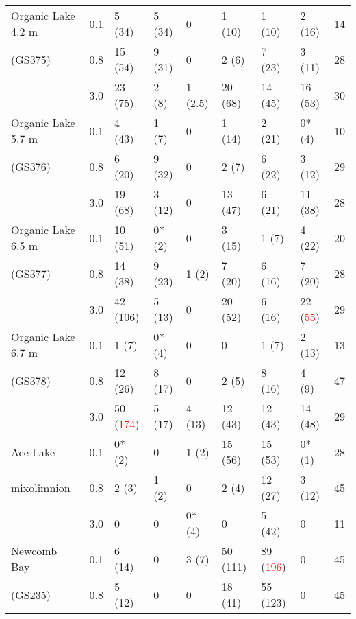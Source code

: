 \begin{longtable}{p{2.8cm}p{0.5cm}p{1.2cm}p{1cm}p{1cm}p{1.4cm}p{1.4cm}p{1.2cm}p{0.5cm}}
Organic Lake 4.2 m             & 0.1 & 5 (34)   & 5 (34)  & 0       & 1 (10)    & 1 (10)    & 2 (16)  & 14 \\
           (GS375)             & 0.8 & 15 (54)  & 9 (31)  & 0       & 2 (6)     & 7 (23)    & 3 (11)  & 28 \\
                               & 3.0 & 23 (75)  & 2 (8)   & 1 (2.5) & 20 (68)   & 14 (45)   & 16 (53) & 30 \\
Organic Lake 5.7 m             & 0.1 & 4 (43)   & 1 (7)   & 0       & 1 (14)    & 2 (21)    & 0* (4)  & 10 \\
          (GS376)              & 0.8 & 6 (20)   & 9 (32)  & 0       & 2 (7)     & 6 (22)    & 3 (12)  & 29 \\
                               & 3.0 & 19 (68)  & 3 (12)  & 0       & 13 (47)   & 6 (21)    & 11 (38) & 28 \\
Organic Lake 6.5 m             & 0.1 & 10 (51)  & 0* (2)  & 0       & 3 (15)    & 1 (7)     & 4 (22)  & 20 \\
           (GS377)             & 0.8 & 14 (38)  & 9 (23)  & 1 (2)   & 7 (20)    & 6 (16)    & 7 (20)  & 28 \\
                               & 3.0 & 42 (106) & 5 (13)  & 0       & 20 (52)   & 6 (16)    & \cellcolor{blue!25}22 (\textcolor{red}{55}) & 29 \\
Organic Lake 6.7 m             & 0.1 & 1 (7)    & 0* (4)  & 0       & 0         & 1 (7)     & 2 (13)  & 13 \\
           (GS378)             & 0.8 & 12 (26)  & 8 (17)  & 0       & 2 (5)     & 8 (16)    & 4 (9)   & 47 \\
                               & 3.0 & \cellcolor{blue!25}50 (\textcolor{red}{174}) & 5 (17)  & 4 (13)  & 12 (43)   & 12 (43)   & 14 (48) & 29 \\
Ace Lake                       & 0.1 & 0* (2)   & 0       & 1 (2)   & 15 (56)   & 15 (53)   & 0* (1)  & 28 \\
mixolimnion                    & 0.8 & 2 (3)    & 1 (2)   & 0       & 2 (4)     & 12 (27)   & 3 (12)  & 45 \\
                               & 3.0 & 0        & 0       & 0* (4)  & 0         & 5 (42)    & 0       & 11 \\
Newcomb Bay                    & 0.1 & 6 (14)   & 0       & 3 (7)   & 50 (111)  & 89 (\textcolor{red}{196})  & 0       & 45 \\
(GS235)                        & 0.8 & 5 (12)   & 0       & 0       & 18 (41)   & 55 (123)  & 0       & 45 \\

\end{longtable}

